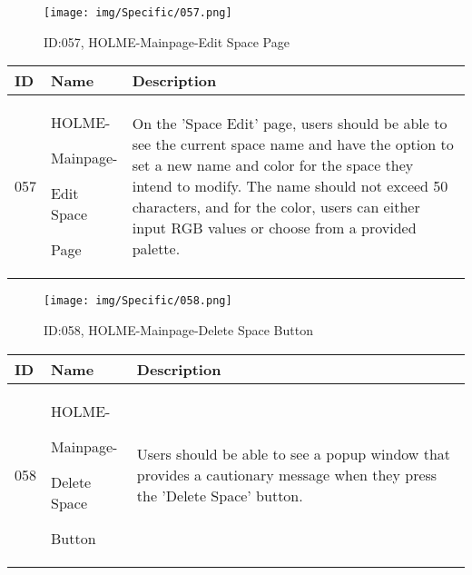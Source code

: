 \documentclass[conference]{IEEEtran}
\begin{document}
\begin{enumerate}
\begin{figure}[h]
\centering
\texttt{[image: img/Specific/057.png]}
\caption{ID:057, HOLME-Mainpage-Edit Space Page}
\end{figure}
\begin{table}[h]
\def\arraystretch{1.2} \small
    \begin{tabular}{|p{1cm}|p{1.8cm}|p{5.0cm}|}
        \hline
        ID & Name & Description\\ \hline
         057 \par  & HOLME-\par Mainpage-\par Edit Space\par Page  &On the 'Space Edit' page, users should be able to see the current space name and have the option to set a new name and color for the space they intend to modify. The name should not exceed 50 characters, and for the color, users can either input RGB values or choose from a provided palette.\\ \hline
    \end{tabular}
\end{table}

\clearpage

\begin{figure}[h]
\centering
\texttt{[image: img/Specific/058.png]}
\caption{ID:058, HOLME-Mainpage-Delete Space Button}
\end{figure}
\begin{table}[h]
\def\arraystretch{1.2} \small
    \begin{tabular}{|p{1cm}|p{1.8cm}|p{5.0cm}|}
        \hline
        ID & Name & Description\\ \hline
         058 \par  & HOLME-\par Mainpage-\par Delete Space\par Button &Users should be able to see a popup window that provides a cautionary message when they press the 'Delete Space' button.\\ \hline
    \end{tabular}
\end{table}


\end{enumerate}
\end{document}
